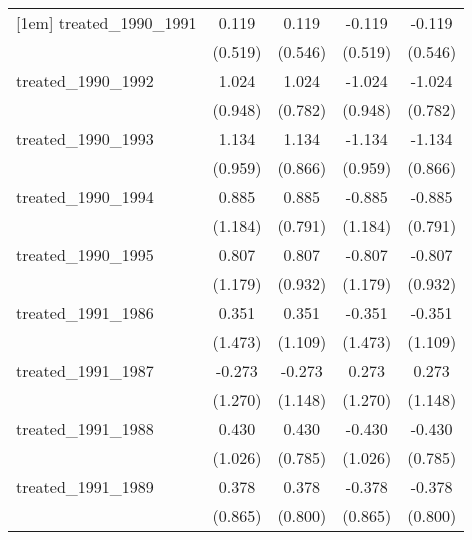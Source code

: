 {\begin{tabular}{l*{4}{c}}
[1em]
treated\_1990\_1991&       0.119         &       0.119         &      -0.119         &      -0.119         \\
            &     (0.519)         &     (0.546)         &     (0.519)         &     (0.546)         \\
[1em]
treated\_1990\_1992&       1.024         &       1.024         &      -1.024         &      -1.024         \\
            &     (0.948)         &     (0.782)         &     (0.948)         &     (0.782)         \\
[1em]
treated\_1990\_1993&       1.134         &       1.134         &      -1.134         &      -1.134         \\
            &     (0.959)         &     (0.866)         &     (0.959)         &     (0.866)         \\
[1em]
treated\_1990\_1994&       0.885         &       0.885         &      -0.885         &      -0.885         \\
            &     (1.184)         &     (0.791)         &     (1.184)         &     (0.791)         \\
[1em]
treated\_1990\_1995&       0.807         &       0.807         &      -0.807         &      -0.807         \\
            &     (1.179)         &     (0.932)         &     (1.179)         &     (0.932)         \\
[1em]
treated\_1991\_1986&       0.351         &       0.351         &      -0.351         &      -0.351         \\
            &     (1.473)         &     (1.109)         &     (1.473)         &     (1.109)         \\
[1em]
treated\_1991\_1987&      -0.273         &      -0.273         &       0.273         &       0.273         \\
            &     (1.270)         &     (1.148)         &     (1.270)         &     (1.148)         \\
[1em]
treated\_1991\_1988&       0.430         &       0.430         &      -0.430         &      -0.430         \\
            &     (1.026)         &     (0.785)         &     (1.026)         &     (0.785)         \\
[1em]
treated\_1991\_1989&       0.378         &       0.378         &      -0.378         &      -0.378         \\
            &     (0.865)         &     (0.800)         &     (0.865)         &     (0.800)         \\

\end{tabular}}

